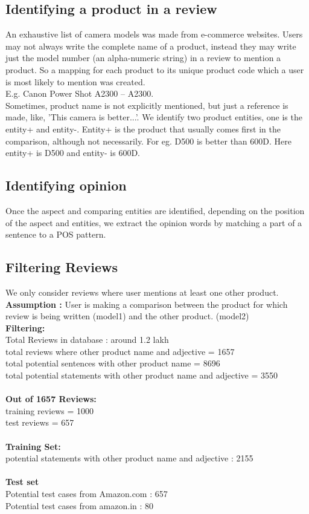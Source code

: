 \documentclass[12pt]{article}
\begin{document}
\subsection{Identifying a product in a review} 
An exhaustive list of camera models was made from e-commerce websites. Users may not always write the complete name of a product, instead they may write just the model number (an alpha-numeric string) in a review to mention a product. So a mapping for each product to its unique product code which a user is most likely to mention was created.\\E.g. Canon Power Shot A2300 -- A2300.\\
Sometimes, product name is not explicitly mentioned, but just a reference is made, like, 'This camera is better...'. 
We identify two product entities, one is the entity+ and entity-. Entity+ is the product that usually comes first in the comparison, although not necessarily. For eg. D500 is better than 600D. Here entity+ is D500 and entity- is 600D.

\subsection{Identifying opinion}
Once the aspect and comparing entities are identified, depending on the position of the aspect and entities, we extract the opinion words by matching a part of a sentence to a POS pattern.

\subsection{Filtering Reviews}
We only consider reviews where user mentions at least one other product. \\
\textbf{Assumption :} User is  making a comparison between the product for which review is being written (model1) and the other product. (model2)\\
\textbf{Filtering:}\\
Total Reviews in database : around 1.2 lakh \\
total reviews where other product name and adjective = 1657 \\
total potential sentences with other product name = 8696 \\
total potential statements with other product name and adjective = 3550 \\\\
\textbf{Out of 1657 Reviews: }\\
training reviews = 1000 \\
test reviews = 657 \\\\
\textbf{ Training Set: }\\potential statements with other product name and adjective  : 2155\\\\
\textbf{Test set}\\
Potential test cases from Amazon.com :  657\\
Potential test cases from amazon.in : 80
\end{document}
